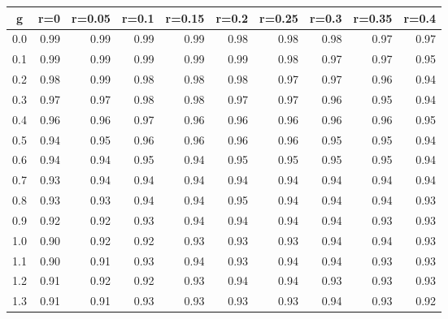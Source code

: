 %
\begin{table}[!tbp]
 \begin{center}
 \begin{tabular}{rrrrrrrrrr}\hline\hline
\multicolumn{1}{c}{g}&\multicolumn{1}{c}{r=0}&\multicolumn{1}{c}{r=0.05}&\multicolumn{1}{c}{r=0.1}&\multicolumn{1}{c}{r=0.15}&\multicolumn{1}{c}{r=0.2}&\multicolumn{1}{c}{r=0.25}&\multicolumn{1}{c}{r=0.3}&\multicolumn{1}{c}{r=0.35}&\multicolumn{1}{c}{r=0.4}\tabularnewline
\hline
0.0&0.99&0.99&0.99&0.99&0.98&0.98&0.98&0.97&0.97\tabularnewline
0.1&0.99&0.99&0.99&0.99&0.99&0.98&0.97&0.97&0.95\tabularnewline
0.2&0.98&0.99&0.98&0.98&0.98&0.97&0.97&0.96&0.94\tabularnewline
0.3&0.97&0.97&0.98&0.98&0.97&0.97&0.96&0.95&0.94\tabularnewline
0.4&0.96&0.96&0.97&0.96&0.96&0.96&0.96&0.96&0.95\tabularnewline
0.5&0.94&0.95&0.96&0.96&0.96&0.96&0.95&0.95&0.94\tabularnewline
0.6&0.94&0.94&0.95&0.94&0.95&0.95&0.95&0.95&0.94\tabularnewline
0.7&0.93&0.94&0.94&0.94&0.94&0.94&0.94&0.94&0.94\tabularnewline
0.8&0.93&0.93&0.94&0.94&0.95&0.94&0.94&0.94&0.93\tabularnewline
0.9&0.92&0.92&0.93&0.94&0.94&0.94&0.94&0.93&0.93\tabularnewline
1.0&0.90&0.92&0.92&0.93&0.93&0.93&0.94&0.94&0.93\tabularnewline
1.1&0.90&0.91&0.93&0.94&0.93&0.94&0.94&0.93&0.93\tabularnewline
1.2&0.91&0.92&0.92&0.93&0.94&0.94&0.93&0.93&0.93\tabularnewline
1.3&0.91&0.91&0.93&0.93&0.93&0.93&0.94&0.93&0.92\tabularnewline
\hline
\end{tabular}

\end{center}

\end{table}


